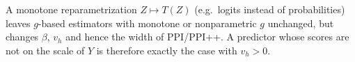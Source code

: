 \begin{remark}[Invariance]
A monotone reparametrization $Z\mapsto T(Z)$ (e.g.\ logits instead of probabilities) leaves $g$-based estimators with monotone or nonparametric $g$ unchanged, but changes $\beta$, $v_h$ and hence the width of PPI/PPI++. A predictor whose scores are not on the scale of $Y$ is therefore exactly the case with $v_h>0$.
\end{remark}
